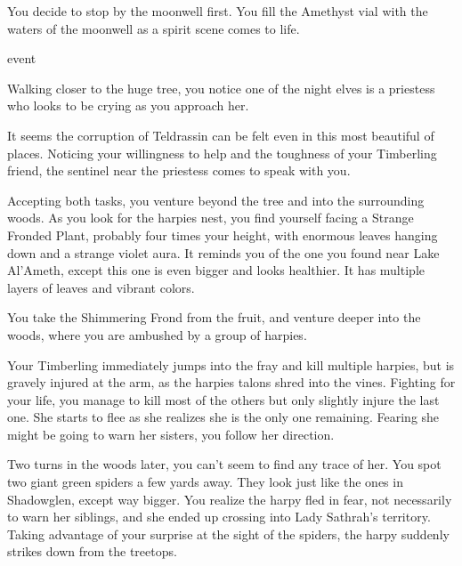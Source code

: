 You decide to stop by the moonwell first. You fill the Amethyst vial with the waters of the moonwell as a spirit scene comes to life.

 event

Walking closer to the huge tree, you notice one of the night elves is a priestess who looks to be crying as you approach her.


It seems the corruption of Teldrassin can be felt even in this most beautiful of places. Noticing your willingness to help and the toughness of your Timberling friend, the sentinel near the priestess comes to speak with you.


Accepting both tasks, you venture beyond the tree and into the surrounding woods. As you look for the harpies nest, you find yourself facing a Strange Fronded Plant, probably four times your height, with enormous leaves hanging down and a strange violet aura. It reminds you of the one you found near Lake Al'Ameth, except this one is even bigger and looks healthier. It has multiple layers of leaves and vibrant colors.


You take the Shimmering Frond from the fruit, and venture deeper into the woods, where you are ambushed by a group of harpies.


Your Timberling immediately jumps into the fray and kill multiple harpies, but is gravely injured at the arm, as the harpies talons shred into the vines. Fighting for your life, you manage to kill most of the others but only slightly injure the last one. She starts to flee as she realizes she is the only one remaining. Fearing she might be going to warn her sisters, you follow her direction.

Two turns in the woods later, you can't seem to find any trace of her. You spot two giant green spiders a few yards away. They look just like the ones in Shadowglen, except way bigger. You realize the harpy fled in fear, not necessarily to warn her siblings, and she ended up crossing into Lady Sathrah's territory. Taking advantage of your surprise at the sight of the spiders, the harpy suddenly strikes down from the treetops.

